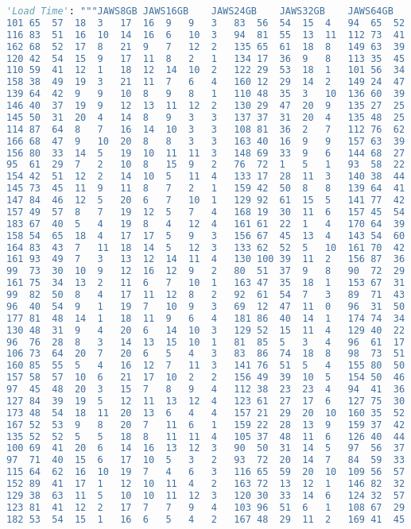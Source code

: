 \begin{lstlisting}[language=python]
    'Load Time': """JAWS8GB	JAWS16GB	JAWS24GB	JAWS32GB	JAWS64GB	NVDA8GB	NVDA16GB	NVDA24GB	NVDA32GB	NVDA64GB	SUPERNOVA8GB	SUPERNOVA16GB	SUPERNOVA24GB	SUPERNOVA32GB	SUPERNOVA64GB	NARRATOR8GB	NARRATOR16GB	NARRATOR24GB	NARRATOR32GB	NARRATOR64GB
101	65	57	18	3	17	16	9	9	3	83	56	54	15	4	94	65	52	7	5
116	83	51	16	10	14	16	6	10	3	94	81	55	13	11	112	73	41	3	4
162	68	52	17	8	21	9	7	12	2	135	65	61	18	8	149	63	39	15	0
120	42	54	15	9	17	11	8	2	1	134	17	36	9	8	113	35	45	6	2
110	59	41	12	1	18	12	14	10	2	122	29	53	18	1	101	56	34	10	7
158	38	49	19	3	21	11	7	6	4	160	12	29	14	2	149	24	47	13	1
139	64	42	9	9	10	8	9	8	1	110	48	35	3	10	136	60	39	4	0
146	40	37	19	9	12	13	11	12	2	130	29	47	20	9	135	27	25	14	8
145	50	31	20	4	14	8	9	3	3	137	37	31	20	4	135	48	25	14	4
114	87	64	8	7	16	14	10	3	3	108	81	36	2	7	112	76	62	-7	3
166	68	47	9	10	20	8	8	3	3	163	40	16	9	9	157	63	39	0	6
156	80	33	14	5	19	10	11	11	3	148	69	33	9	6	144	68	27	12	10
95	61	29	7	2	10	8	15	9	2	76	72	1	5	1	93	58	22	-6	9
154	42	51	12	2	14	10	5	11	4	133	17	28	11	3	140	38	44	6	8
145	73	45	11	9	11	8	7	2	1	159	42	50	8	8	139	64	41	9	7
147	84	46	12	5	20	6	7	10	1	129	92	61	15	5	141	77	42	9	9
157	49	57	8	7	19	12	5	7	4	168	19	30	11	6	157	45	54	-4	6
183	67	40	5	4	19	8	4	12	4	161	61	22	1	4	170	64	39	-7	10
158	54	65	18	4	17	17	5	9	3	156	67	45	13	4	143	54	60	9	11
164	83	43	7	11	18	14	5	12	3	133	62	52	5	10	161	70	42	3	4
161	93	49	7	3	13	12	14	11	4	130	100	39	11	2	156	87	36	6	2
99	73	30	10	9	12	16	12	9	2	80	51	37	9	8	90	72	29	1	7
161	75	34	13	2	11	6	7	10	1	163	47	35	18	1	153	67	31	6	2
99	82	50	8	4	17	11	12	8	2	92	61	54	7	3	89	71	43	5	2
96	40	54	9	1	19	7	10	9	3	69	12	47	11	0	96	31	50	1	7
177	81	48	14	1	18	11	9	6	4	181	86	40	14	1	174	74	34	0	13
130	48	31	9	4	20	6	14	10	3	129	52	15	11	4	129	40	22	7	1
96	76	28	8	3	14	13	15	10	1	81	85	5	3	4	96	61	17	2	0
106	73	64	20	7	20	6	5	4	3	83	86	74	18	8	98	73	51	18	4
160	85	55	5	4	16	12	7	11	3	141	76	51	5	4	155	80	50	-5	3
157	58	57	10	6	21	17	10	2	2	156	49	39	10	5	154	50	46	4	1
97	45	48	20	3	15	7	8	9	4	112	38	23	23	4	94	41	36	14	4
127	84	39	19	5	12	11	13	12	4	123	61	27	17	6	127	75	30	19	3
173	48	54	18	11	20	13	6	4	4	157	21	29	20	10	160	35	52	17	7
167	52	53	9	8	20	7	11	6	1	159	22	28	13	9	159	37	42	-2	3
135	52	52	5	5	18	8	11	11	4	105	37	48	11	6	126	40	44	-2	5
100	69	41	20	6	14	16	13	12	3	90	50	31	14	5	97	56	37	16	0
97	71	40	15	6	17	10	5	3	2	93	72	20	14	7	84	59	33	8	5
115	64	62	16	10	19	7	4	6	3	116	65	59	20	10	109	56	57	11	7
152	89	41	17	1	12	10	11	4	2	163	72	13	12	1	146	82	32	5	5
129	38	63	11	5	10	10	11	12	3	120	30	33	14	6	124	32	57	9	7
123	81	41	12	2	17	7	7	9	4	103	96	51	6	1	108	67	29	6	7
182	53	54	15	1	16	6	5	4	2	167	48	29	11	2	169	41	45	3	4

\end{lstlisting}

